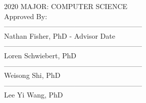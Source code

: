 \begin{flushleft}
    \vspace*{-0.20in}
    \hspace*{3.09in}2020 %
    \hspace*{3.09in}MAJOR: COMPUTER SCIENCE\\ %
    \hspace*{3.09in}Approved By:\\
    \hspace*{3.09in}-----------------------------------------------------------\\
    \vspace*{-0.25in}
    \hspace*{3.09in}Nathan Fisher, PhD - Advisor\hspace*{0.5 in} Date\\
    \bigskip
    \hspace*{3.09in}-----------------------------------------------------------\\
    \vspace*{-0.25in}
    \hspace*{3.09in}Loren Schwiebert, PhD\\
    \bigskip
    \hspace*{3.09in}-----------------------------------------------------------\\
    \vspace*{-0.25in}
    \hspace*{3.09in}Weisong Shi, PhD\\
    \bigskip
    \hspace*{3.09in}-----------------------------------------------------------\\
    \vspace*{-0.25in}
    \hspace*{3.09in}Lee Yi Wang, PhD\\
\end{flushleft}
